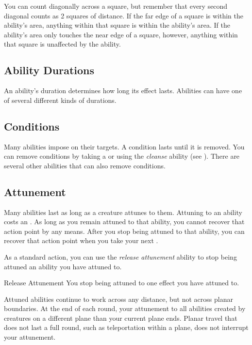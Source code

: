             You can count diagonally across a square, but remember that every second diagonal counts as 2 squares of distance.
            If the far edge of a square is within the ability's area, anything within that square is within the ability's area.
            If the ability's area only touches the near edge of a square, however, anything within that square is unaffected by the ability.

    \subsection{Ability Durations}

        An ability's duration determines how long its effect lasts.
        Abilities can have one of several different kinds of durations.

    \subsection{Conditions}\label{Conditions}
        Many abilities impose  on their targets.
        A condition lasts until it is removed.
        You can remove conditions by taking a  or using the \textit{cleanse} ability (see ).
        There are several other abilities that can also remove conditions.

    \subsection{Attunement}\label{Attunement}
        Many abilities last as long as a creature attunes to them.
        Attuning to an ability costs an .
        As long as you remain attuned to that ability, you cannot recover that action point by any means.
        After you stop being attuned to that ability, you can recover that action point when you take your next .

        As a standard action, you can use the \textit{release attunement} ability to stop being attuned an ability you have attuned to.
        \begin{freeability}{Release Attunement}
            You stop being attuned to one effect you have attuned to.
        \end{freeability}

        Attuned abilities continue to work across any distance, but not across planar boundaries.
        At the end of each round, your attunement to all abilities created by creatures on a different plane than your current plane ends.
        Planar travel that does not last a full round, such as teleportation within a plane, does not interrupt your attunement.

